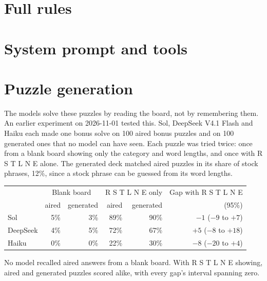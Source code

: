 
\section{Full rules}\label{app:rules}

\section{System prompt and tools}\label{app:prompt}



\section{Puzzle generation}\label{app:puzzles}

The models solve these puzzles by reading the board, not by remembering them. An earlier experiment on 2026-11-01 tested this. Sol, DeepSeek V4.1 Flash and Haiku each made one bonus solve on 100 aired bonus puzzles and on 100 generated ones that no model can have seen. Each puzzle was tried twice: once from a blank board showing only the category and word lengths, and once with R S T L N E alone. The generated deck matched aired puzzles in its share of stock phrases, 12\%, since a stock phrase can be guessed from its word lengths.

\begin{center}
\begin{tabular}{lrrrrr}
\toprule
 & \multicolumn{2}{c}{Blank board} & \multicolumn{2}{c}{R S T L N E only} & Gap with R S T L N E \\
 & aired & generated & aired & generated & (95\%) \\
\midrule
Sol & 5\% & 3\% & 89\% & 90\% & $-1$ ($-9$ to $+7$) \\
DeepSeek & 4\% & 5\% & 72\% & 67\% & $+5$ ($-8$ to $+18$) \\
Haiku & 0\% & 0\% & 22\% & 30\% & $-8$ ($-20$ to $+4$) \\
\bottomrule
\end{tabular}
\end{center}

No model recalled aired answers from a blank board. With R S T L N E showing, aired and generated puzzles scored alike, with every gap's interval spanning zero.

